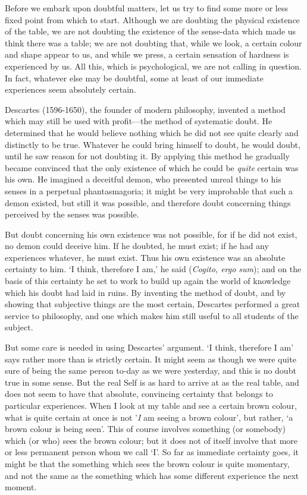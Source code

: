 \documentclass[oneside,letterpaper,12pt]{book}
\begin{document}
Before we embark upon doubtful matters, let us try to find some more or
less fixed point from which to start. Although we are doubting the
physical existence of the table, we are not doubting the existence of
the sense-data which made us think there was a table; we are not
doubting that, while we look, a certain colour and shape appear to us,
and while we press, a certain sensation of hardness is experienced by
us. All this, which is psychological, we are not calling in question. In
fact, whatever else may be doubtful, some at least of our immediate
experiences seem absolutely certain.

Descartes (1596-1650), the founder of modern philosophy, invented a
method which may still be used with profit---the method of systematic
doubt. \label{doubt} He determined that he would believe nothing which he did not see
quite clearly and distinctly to be true. Whatever he could bring himself
to doubt, he would doubt, until he saw reason for not doubting it. By
applying this method he gradually became convinced that the only
existence of which he could be \emph{quite} certain was his own. He
imagined a deceitful demon, who presented unreal things to his senses in
a perpetual phantasmagoria; it might be very improbable that such a
demon existed, but still it was possible, and therefore doubt concerning
things perceived by the senses was possible.

But doubt concerning his own existence was not possible, for if he did
not exist, no demon could deceive him. If he doubted, he must exist; if
he had any experiences whatever, he must exist. Thus his own existence
was an absolute certainty to him. `I think, therefore I
am,' he said (\emph{Cogito, ergo sum}); and on the
basis of this certainty he set to work to build up again the world of
knowledge which his doubt had laid in ruins. By inventing the method of
doubt, and by showing that subjective things are the most certain,
Descartes performed a great service to philosophy, and one which makes
him still useful to all students of the subject.

But some care is needed in using Descartes' argument.
`I think, therefore I am' says rather
more than is strictly certain. It might seem as though we were quite
sure of being the same person to-day as we were yesterday, and this is
no doubt true in some sense. But the real Self is as hard to arrive at
as the real table, and does not seem to have that absolute, convincing
certainty that belongs to particular experiences. \label{self} When I look at my
table and see a certain brown colour, what is quite certain at once is
not '\emph{I} am seeing a brown colour',
but rather, `a brown colour is being
seen'. This of course involves something (or somebody)
which (or who) sees the brown colour; but it does not of itself involve
that more or less permanent person whom we call
`I'. So far as immediate certainty goes,
it might be that the something which sees the brown colour is quite
momentary, and not the same as the something which has some different
experience the next moment.
\end{document}
